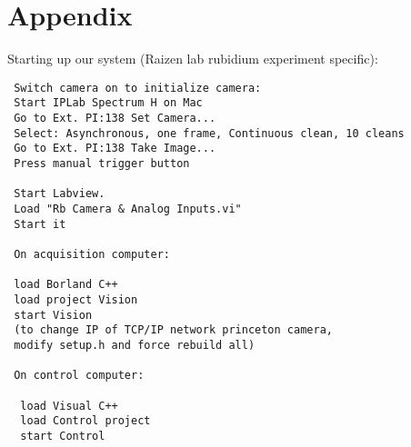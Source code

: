 \section{Appendix}

Starting up our system (Raizen lab rubidium experiment specific):

\begin{verbatim}
 Switch camera on to initialize camera:
 Start IPLab Spectrum H on Mac
 Go to Ext. PI:138 Set Camera...
 Select: Asynchronous, one frame, Continuous clean, 10 cleans
 Go to Ext. PI:138 Take Image...
 Press manual trigger button

 Start Labview.
 Load "Rb Camera & Analog Inputs.vi"
 Start it

 On acquisition computer:

 load Borland C++
 load project Vision
 start Vision
 (to change IP of TCP/IP network princeton camera,
 modify setup.h and force rebuild all)

 On control computer:

  load Visual C++
  load Control project
  start Control
\end{verbatim}
